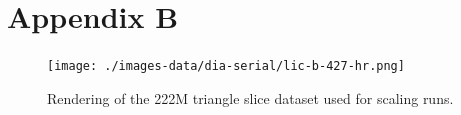 \documentclass[a4paper,10pt]{article}
\begin{document}
\section{Appendix B}
\label{sec:scaling-data}
\begin{figure}[ht]
 \centering
 \texttt{[image: ./images-data/dia-serial/lic-b-427-hr.png]}
 \caption{Rendering of the 222M triangle slice dataset used for scaling runs.}
 \label{fig:scaling-lic}
\end{figure}

\end{document}
